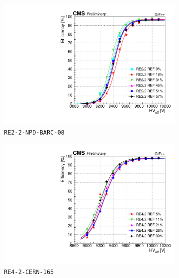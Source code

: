 \begin{figure}[H]
\begin{subfigure}{0.5\linewidth}
    		\includegraphics[width = \linewidth]{fig/chapt5/600-efficiency_vs_HV_RE2_2-REF.pdf}
        	\caption{\label{fig:GIFpp_eff_vs_HV_600:C} \texttt{RE2-2-NPD-BARC-08}}
    	\end{subfigure}
    	\begin{subfigure}{0.5\linewidth}
			\centering
    		\includegraphics[width = \linewidth]{fig/chapt5/600-efficiency_vs_HV_RE4_2-REF.pdf}
        	\caption{\label{fig:GIFpp_eff_vs_HV_600:D} \texttt{RE4-2-CERN-165}}
    	\end{subfigure}
		\caption{\label{fig:GIFpp_eff_vs_HV_600} }
	\end{figure}
	
